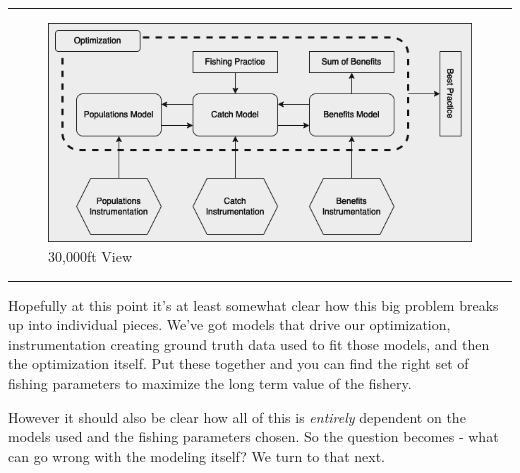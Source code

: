 \documentclass[11pt,a5paper]{book}
\begin{document}
\noindent \rule{\textwidth}{0.5pt} 
\begin{figure}[h!] 
  \includegraphics[width=\linewidth]{drawings/high_level.png}
  \caption{30,000ft View}
  \label{fig:high_level}
\end{figure}
\newline
\rule{\textwidth}{0.5pt} 
\vspace{5pt}

Hopefully at this point it's at least somewhat clear how this big problem breaks up into individual pieces. We've got models that drive our optimization, instrumentation creating ground truth data used to fit those models, and then the optimization itself. Put these together and you can find the right set of fishing parameters to maximize the long term value of the fishery. 
\newline

However it should also be clear how all of this is \textit{entirely} dependent on the models used and the fishing parameters chosen. So the question becomes - what can go wrong with the modeling itself? We turn to that next. 


\newpage



\end{document}
